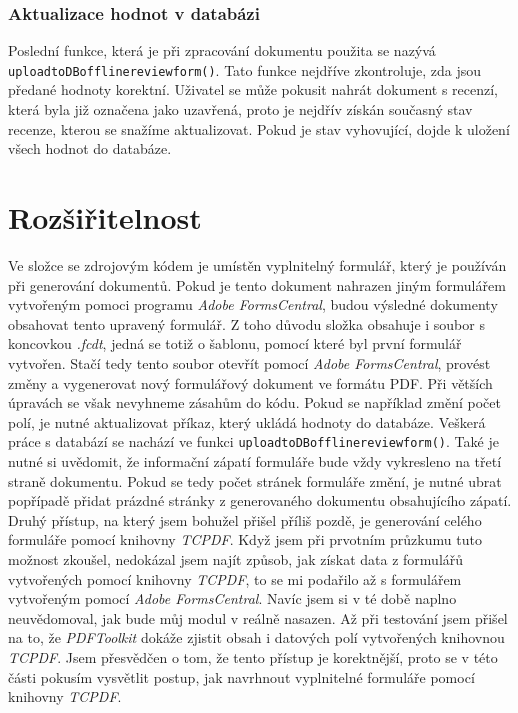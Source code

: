 \documentclass[czech,BP]{thesiskiv}
\begin{document}
\subsection{Aktualizace hodnot v databázi}
\sloppy
Poslední funkce, která je při zpracování dokumentu použita se nazývá \texttt{upload\textunderscore to\textunderscore DB\textunderscore offline\textunderscore review\textunderscore form()}. Tato funkce nejdříve zkontroluje, zda jsou předané hodnoty korektní. Uživatel se může pokusit nahrát dokument s recenzí, která byla již označena jako uzavřená, proto je nejdřív získán současný stav recenze, kterou se snažíme aktualizovat. Pokud je stav vyhovující, dojde k uložení všech hodnot do databáze. 
\chapter{Rozšiřitelnost}
Ve složce se zdrojovým kódem je umístěn vyplnitelný formulář, který je používán při generování dokumentů. Pokud je tento dokument nahrazen jiným formulářem vytvořeným pomoci programu \emph{Adobe FormsCentral}, budou výsledné dokumenty obsahovat tento upravený formulář. Z toho důvodu složka obsahuje i soubor s koncovkou \emph{.fcdt}, jedná se totiž o šablonu, pomocí které byl první formulář vytvořen. Stačí tedy tento soubor otevřít pomocí \emph{Adobe FormsCentral}, provést změny a vygenerovat nový formulářový dokument ve formátu PDF. 
\sloppy
Při větších úpravách se však nevyhneme zásahům do kódu. Pokud se například změní počet polí, je nutné aktualizovat příkaz, který ukládá hodnoty do databáze. Veškerá práce s databází se nachází ve funkci \texttt{upload\textunderscore to\textunderscore DB\textunderscore offline\textunderscore review\textunderscore form()}. Také je nutné si uvědomit, že informační zápatí formuláře bude vždy vykresleno na třetí straně dokumentu. Pokud se tedy počet stránek formuláře změní, je nutné ubrat popřípadě přidat prázdné stránky z generovaného dokumentu obsahujícího zápatí.
Druhý přístup, na který jsem bohužel přišel příliš pozdě, je generování celého formuláře pomocí knihovny \emph{TCPDF}. Když jsem při prvotním průzkumu tuto možnost zkoušel, nedokázal jsem najít způsob, jak získat data z formulářů vytvořených pomocí knihovny \emph{TCPDF}, to se mi podařilo až s formulářem vytvořeným pomocí \emph{Adobe FormsCentral}. Navíc jsem si v té době naplno neuvědomoval, jak bude můj modul v reálně nasazen. Až při testování jsem přišel na to, že \emph{PDFToolkit} dokáže zjistit obsah i datových polí vytvořených knihovnou \emph{TCPDF}. Jsem přesvědčen o tom, že tento přístup je korektnější, proto se v této části pokusím vysvětlit postup, jak navrhnout vyplnitelné formuláře pomocí knihovny \emph{TCPDF}.
\end{document}
